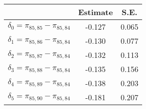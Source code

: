 \begin{tabular}{l*{2}{c}}
\hline\hline
            &    Estimate&        S.E.\\
\hline
$ \delta_0 = \pi_{85,85} - \pi_{85,84} $          &      -0.127&       0.065\\
$ \delta_1 = \pi_{85,86} - \pi_{85,84} $          &      -0.130&       0.077\\
$ \delta_2 = \pi_{85,87} - \pi_{85,84} $          &      -0.132&       0.113\\
$ \delta_3 = \pi_{85,88} - \pi_{85,84} $          &      -0.135&       0.156\\
$ \delta_4 = \pi_{85,89} - \pi_{85,84} $          &      -0.138&       0.203\\
$ \delta_5 = \pi_{85,90} - \pi_{85,84} $          &      -0.181&       0.207\\
\hline\hline
\end{tabular}
